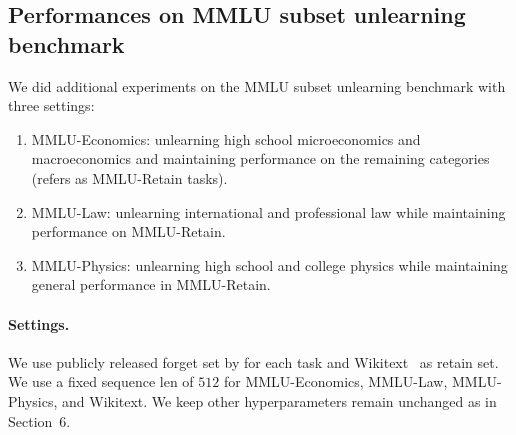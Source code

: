 \documentclass[letterpaper]{article} %
\begin{document}
\subsection{Performances on MMLU subset unlearning benchmark}
We did additional experiments on the MMLU subset unlearning benchmark with three settings: 
\begin{enumerate}
    \item MMLU-Economics: unlearning high school microeconomics and macroeconomics and maintaining performance on the remaining categories (refers as MMLU-Retain tasks).
    \item MMLU-Law: unlearning international and professional law while maintaining performance on MMLU-Retain.
    \item MMLU-Physics: unlearning high school and college physics while maintaining general performance in MMLU-Retain.
\end{enumerate}

\paragraph{Settings.}  We use publicly released forget set by \citet{wmdp} for each task and Wikitext~\cite{wikitext} as retain set. We use a fixed sequence len of $512$ for MMLU-Economics, MMLU-Law, MMLU-Physics, and Wikitext. We keep other hyperparameters remain unchanged as in Section~6.
\end{document}
